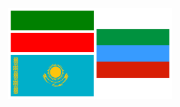 \documentclass[a0paper,fontscale=0.3]{baposter}  %
\begin{document}
\begin{poster}
{			%
		}{
				\includegraphics[height=6.5em,bb=0 0 800 480]{flags/flags}
		}



\end{poster}
\end{document}

